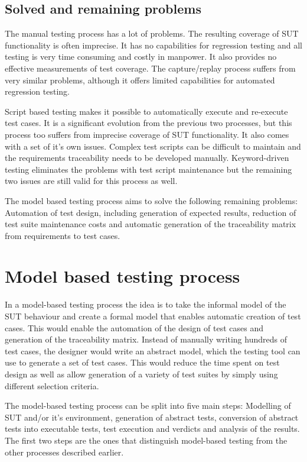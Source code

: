 \subsection{Solved and remaining problems}
The manual testing process has a lot of problems. The resulting coverage of SUT functionality is often imprecise. It has no capabilities for regression testing and all testing is very time consuming and costly in manpower. It also provides no effective measurements of test coverage. The capture/replay process suffers from very similar problems, although it offers limited capabilities for automated regression testing.

Script based testing makes it possible to automatically execute and re-execute test cases. It is a significant evolution from the previous two processes, but this process too suffers from imprecise coverage of SUT functionality. It also comes with a set of it's own issues. Complex test scripts can be difficult to maintain and the requirements traceability needs to be developed manually. Keyword-driven testing eliminates the problems with test script maintenance but the remaining two issues are still valid for this process as well.

The model based testing process aims to solve the following remaining problems: Automation of test design, including generation of expected results, reduction of test suite maintenance costs and automatic generation of the traceability matrix from requirements to test cases.

\section{Model based testing process}
In a model-based testing process the idea is to take the informal model of the SUT behaviour and create a formal model that enables automatic creation of test cases. This would enable the automation of the design of test cases and generation of the traceability matrix. Instead of manually writing hundreds of test cases, the designer would write an abstract model, which the testing tool can use to generate a set of test cases. This would reduce the time spent on test design as well as allow generation of a variety of test suites by simply using different selection criteria.

The model-based testing process can be split into five main steps: Modelling of SUT and/or it's environment, generation of abstract tests, conversion of abstract tests into executable tests, test execution and verdicts and analysis of the results. The first two steps are the ones that distinguish model-based testing from the other processes described earlier.


